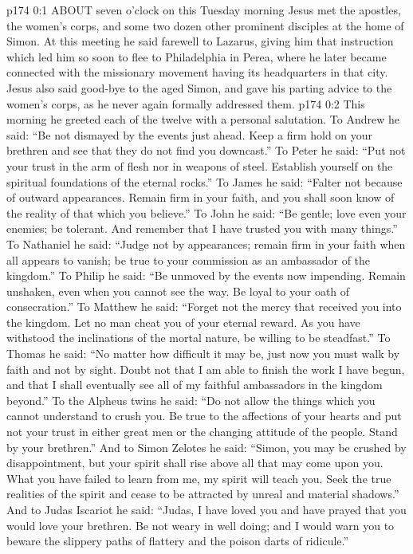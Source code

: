 \vs p174 0:1 ABOUT seven o’clock on this Tuesday morning Jesus met the apostles, the women’s corps, and some two dozen other prominent disciples at the home of Simon. At this meeting he said farewell to Lazarus, giving him that instruction which led him so soon to flee to Philadelphia in Perea, where he later became connected with the missionary movement having its headquarters in that city. Jesus also said good\hyp{}bye to the aged Simon, and gave his parting advice to the women’s corps, as he never again formally addressed them.
\vs p174 0:2 This morning he greeted each of the twelve with a personal salutation. To Andrew he said: \textcolor{ubdarkred}{“Be not dismayed by the events just ahead. Keep a firm hold on your brethren and see that they do not find you downcast.”} To Peter he said: \textcolor{ubdarkred}{“Put not your trust in the arm of flesh nor in weapons of steel. Establish yourself on the spiritual foundations of the eternal rocks.”} To James he said: \textcolor{ubdarkred}{“Falter not because of outward appearances. Remain firm in your faith, and you shall soon know of the reality of that which you believe.”} To John he said: \textcolor{ubdarkred}{“Be gentle; love even your enemies; be tolerant. And remember that I have trusted you with many things.”} To Nathaniel he said: \textcolor{ubdarkred}{“Judge not by appearances; remain firm in your faith when all appears to vanish; be true to your commission as an ambassador of the kingdom.”} To Philip he said: \textcolor{ubdarkred}{“Be unmoved by the events now impending. Remain unshaken, even when you cannot see the way. Be loyal to your oath of consecration.”} To Matthew he said: \textcolor{ubdarkred}{“Forget not the mercy that received you into the kingdom. Let no man cheat you of your eternal reward. As you have withstood the inclinations of the mortal nature, be willing to be steadfast.”} To Thomas he said: \textcolor{ubdarkred}{“No matter how difficult it may be, just now you must walk by faith and not by sight. Doubt not that I am able to finish the work I have begun, and that I shall eventually see all of my faithful ambassadors in the kingdom beyond.”} To the Alpheus twins he said: \textcolor{ubdarkred}{“Do not allow the things which you cannot understand to crush you. Be true to the affections of your hearts and put not your trust in either great men or the changing attitude of the people. Stand by your brethren.”} And to Simon Zelotes he said: \textcolor{ubdarkred}{“Simon, you may be crushed by disappointment, but your spirit shall rise above all that may come upon you. What you have failed to learn from me, my spirit will teach you. Seek the true realities of the spirit and cease to be attracted by unreal and material shadows.”} And to Judas Iscariot he said: \textcolor{ubdarkred}{“Judas, I have loved you and have prayed that you would love your brethren. Be not weary in well doing; and I would warn you to beware the slippery paths of flattery and the poison darts of ridicule.”}
